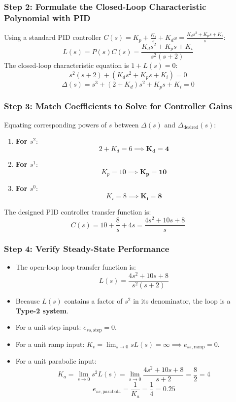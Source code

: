 \documentclass[12pt,onecolumn,twoside ]{article}
\begin{document}
	\subsubsection{Step 2: Formulate the Closed-Loop Characteristic Polynomial with PID}
	Using a standard PID controller $C(s) = K_p + \frac{K_i}{s} + K_d s = \frac{K_d s^2 + K_p s + K_i}{s}$: \[
	L(s) = P(s)C(s) = \frac{K_d s^2 + K_p s + K_i}{s^2(s + 2)}
	\] The closed-loop characteristic equation is $1 + L(s) = 0$: \[
	s^2(s + 2) + (K_d s^2 + K_p s + K_i) = 0
	\] \[
	\Delta(s) = s^3 + (2 + K_d)s^2 + K_p s + K_i = 0
	\]
	\subsubsection{Step 3: Match Coefficients to Solve for Controller Gains}
	Equating corresponding powers of $s$ between $\Delta(s)$ and $\Delta_{\text{desired}}(s)$:
	\begin{enumerate}
		\item
		\textbf{For $s^2$}: \[
		2 + K_d = 6 \implies \mathbf{K_d = 4}
		\]
		\item
		\textbf{For $s^1$}: \[
		K_p = 10 \implies \mathbf{K_p = 10}
		\]
		\item
		\textbf{For $s^0$}: \[
		K_i = 8 \implies \mathbf{K_i = 8}
		\]
	\end{enumerate}
	The designed PID controller transfer function is: \[
	C(s) = 10 + \frac{8}{s} + 4s = \frac{4s^2 + 10s + 8}{s}
	\]
	\subsubsection{Step 4: Verify Steady-State Performance}
	\begin{itemize}
		\item
		The open-loop loop transfer function is: \[
		L(s) = \frac{4s^2 + 10s + 8}{s^2(s + 2)}
		\]
		\item
		Because $L(s)$ contains a factor of $s^2$ in its denominator, the loop is a \textbf{Type-2 system}.
		\item
		For a unit step input: $e_{ss,\text{step}} = 0$.
		\item
		For a unit ramp input: $K_v = \lim_{s \to 0} s L(s) = \infty \implies e_{ss,\text{ramp}} = 0$.
		\item
		For a unit parabolic input: \[
		K_a = \lim_{s \to 0} s^2 L(s) = \lim_{s \to 0} \frac{4s^2 + 10s + 8}{s + 2} = \frac{8}{2} = 4
		\] \[
		e_{ss,\text{parabola}} = \frac{1}{K_a} = \frac{1}{4} = 0.25
		\]
	\end{itemize}
	
\end{document}
